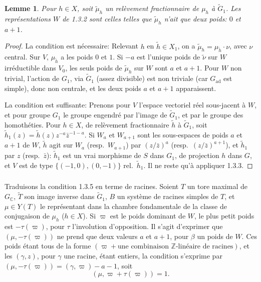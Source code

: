 \documentclass[12pt,a4paper]{article}
\theoremstyle{plain}
\newtheorem{lemma}[theorem]{Lemme}
\theoremstyle{definition}
\theoremstyle{remark}
\newcommand{\ZZ}{\mathbb{Z}}
\newcommand{\CC}{\mathbb{C}}
\begin{document}
\begin{lemma}
Pour $h \in X$, soit $\tilde{\mu}_h$ un rel\`evement fractionnaire de $\mu_h$ \`a $\tilde{G}_1$. Les repr\'esentations $W$ de 1.3.2 sont celles telles que $\tilde{\mu}_h$ n'ait que deux poids: $0$ et $a+1$.
\end{lemma}

\begin{proof}
La condition est n\'ecessaire: Relevant $h$ en $\tilde{h} \in X_1$, on a $\tilde{\mu}_h = \mu_{\tilde{h}} \cdot \nu$, avec $\nu$ central. Sur $V$, $\mu_{\tilde{h}}$ a les poids $0$ et $1$. Si $-a$ est l'unique poids de $\tilde{\nu}$ sur $W$ irr\'eductible dans $V_0$, les seuls poids de $\tilde{\mu}_h$ sur $W$ sont $a$ et $a+1$. Pour $W$ non trivial, l'action de $G_1$, via $\tilde{G}_1$ (assez divisible) est non triviale (car $G_{\text{ad}}$ est simple), donc non centrale, et les deux poids $a$ et $a+1$ apparaissent.

La condition est suffisante: Prenons pour $V$ l'espace vectoriel r\'eel sous-jacent \`a $W$, et pour groupe $G_1$ le groupe engendr\'e par l'image de $\tilde{G}_1$, et par le groupe des homoth\'eties. Pour $h \in X$, de rel\`evement fractionnaire $\tilde{h}$ \`a $\tilde{G}_1$, soit $\tilde{h}_1(z) = \tilde{h}(z)z^{-a}\bar{z}^{-1-a}$. Si $W_a$ et $W_{a+1}$ sont les sous-espaces de poids $a$ et $a+1$ de $W$, $\tilde{h}$ agit sur $W_a$ (resp.~$W_{a+1}$) par $(z/\bar{z})^a$ (resp.~$(z/\bar{z})^{a+1}$), et $\tilde{h}_1$ par $z$ (resp.~$\bar{z}$): $\tilde{h}_1$ est un vrai morphisme de $S$ dans $G_1$, de projection $h$ dans $G$, et $V$ est de type $\{(-1,0),(0,-1)\}$ rel.~$\tilde{h}_1$. Il ne reste qu'\`a appliquer 1.3.3.
\end{proof}

\subsubsection{}

Traduisons la condition 1.3.5 en terme de racines. Soient $T$ un tore maximal de $G_{\CC}$, $\tilde{T}$ son image inverse dans $\tilde{G}_1$, $B$ un syst\`eme de racines simples de $T$, et $\mu \in Y(T)$ le repr\'esentant dans la chambre fondamentale de la classe de conjugaison de $\mu_h$ ($h \in X$). Si $\varpi$ est le poids dominant de $W$, le plus petit poids est $-\tau(\varpi)$, pour $\tau$ l'involution d'opposition. Il s'agit d'exprimer que $(\mu,-\tau(\varpi))$ ne prend que deux valeurs $a$ et $a+1$, pour $\beta$ un poids de $W$. Ces poids \'etant tous de la forme $(\varpi + \text{une combinaison }\ZZ\text{-lin\'eaire de racines})$, et les $(\gamma,z)$, pour $\gamma$ une racine, \'etant entiers, la condition s'exprime par $(\mu,-\tau(\varpi)) = (\gamma,\varpi) - a - 1$, soit
\begin{equation}\label{eq:1.3.6.1}
(\mu, \varpi + \tau(\varpi)) = 1.
\end{equation}
\end{document}
